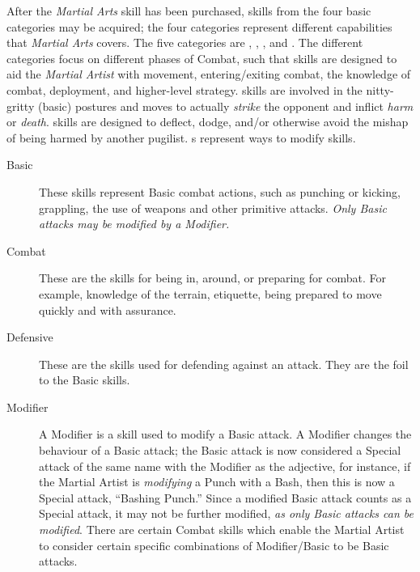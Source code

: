 After the \emph{Martial Arts} skill has been purchased, skills from
the four basic categories may be acquired; the four categories
represent different capabilities that \emph{Martial Arts} covers. The
five categories are , ,
, and . The different categories
focus on different phases of Combat, such that 
skills are designed to aid the \emph{Martial Artist} with movement,
entering/exiting combat, the knowledge of combat, deployment, and
higher-level strategy.  skills are involved in the
nitty-gritty (basic) postures and moves to actually \textsl{strike}
the opponent and inflict \textsl{harm} or
\textsl{death}.  skills are designed to deflect,
dodge, and/or otherwise avoid the mishap of being harmed by another
pugilist. s represent ways to modify
 skills.

\begin{description}
\item[Basic] These skills represent Basic combat actions, such as
  punching or kicking, grappling, the use of weapons and other
  primitive attacks. \emph{Only Basic attacks may be \emph{modified}
    by a Modifier.}
\item[Combat] These are the skills for being in, around, or preparing
  for combat. For example, knowledge of the terrain, etiquette, being
  prepared to move quickly and with assurance.

\item[Defensive] These are the skills used for defending against an
  attack. They are the foil to the Basic skills.

\item[Modifier] A Modifier is a skill used to modify a Basic attack. A
  Modifier changes the behaviour of a Basic attack; the Basic attack
  is now considered a Special attack of the same name with the
  Modifier as the adjective, for instance, if the Martial Artist is
  \emph{modifying} a Punch with a Bash, then this is now a Special
  attack, ``Bashing Punch.'' Since a modified Basic attack counts as a
  Special attack, it may not be further modified, \emph{as only Basic
    attacks can be modified}. There are certain Combat skills which
  enable the Martial Artist to consider certain specific combinations
  of Modifier/Basic to be Basic attacks.
\end{description}


